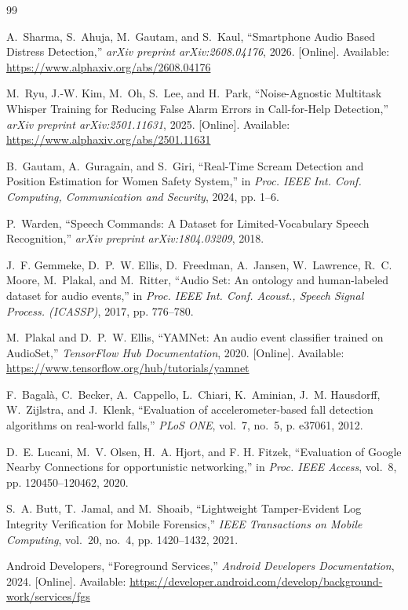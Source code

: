 \documentclass[conference]{IEEEtran}
\begin{document}
\begin{thebibliography}{99}

A.~Sharma, S.~Ahuja, M.~Gautam, and S.~Kaul, ``Smartphone Audio Based Distress Detection,'' \emph{arXiv preprint arXiv:2608.04176}, 2026. [Online]. Available: \url{https://www.alphaxiv.org/abs/2608.04176}

M.~Ryu, J.-W. Kim, M.~Oh, S.~Lee, and H.~Park, ``Noise-Agnostic Multitask Whisper Training for Reducing False Alarm Errors in Call-for-Help Detection,'' \emph{arXiv preprint arXiv:2501.11631}, 2025. [Online]. Available: \url{https://www.alphaxiv.org/abs/2501.11631}

B.~Gautam, A.~Guragain, and S.~Giri, ``Real-Time Scream Detection and Position Estimation for Women Safety System,'' in \emph{Proc. IEEE Int. Conf. Computing, Communication and Security}, 2024, pp. 1--6.

P.~Warden, ``Speech Commands: A Dataset for Limited-Vocabulary Speech Recognition,'' \emph{arXiv preprint arXiv:1804.03209}, 2018.

J.~F. Gemmeke, D.~P.~W. Ellis, D.~Freedman, A.~Jansen, W.~Lawrence, R.~C. Moore, M.~Plakal, and M.~Ritter, ``Audio Set: An ontology and human-labeled dataset for audio events,'' in \emph{Proc. IEEE Int. Conf. Acoust., Speech Signal Process. (ICASSP)}, 2017, pp. 776--780.

M.~Plakal and D.~P.~W. Ellis, ``YAMNet: An audio event classifier trained on AudioSet,'' \emph{TensorFlow Hub Documentation}, 2020. [Online]. Available: \url{https://www.tensorflow.org/hub/tutorials/yamnet}

F.~Bagal\`a, C.~Becker, A.~Cappello, L.~Chiari, K.~Aminian, J.~M. Hausdorff, W.~Zijlstra, and J.~Klenk, ``Evaluation of accelerometer-based fall detection algorithms on real-world falls,'' \emph{PLoS ONE}, vol.~7, no.~5, p. e37061, 2012.

D.~E. Lucani, M.~V. Olsen, H.~A. Hjort, and F. H. Fitzek, ``Evaluation of Google Nearby Connections for opportunistic networking,'' in \emph{Proc. IEEE Access}, vol.~8, pp. 120450--120462, 2020.

S.~A. Butt, T.~Jamal, and M.~Shoaib, ``Lightweight Tamper-Evident Log Integrity Verification for Mobile Forensics,'' \emph{IEEE Transactions on Mobile Computing}, vol.~20, no.~4, pp. 1420--1432, 2021.

Android Developers, ``Foreground Services,'' \emph{Android Developers Documentation}, 2024. [Online]. Available: \url{https://developer.android.com/develop/background-work/services/fgs}


\end{thebibliography}
\end{document}
